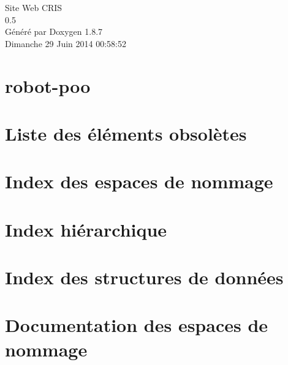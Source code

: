 \documentclass[twoside]{book}
\newcommand{\+}{\discretionary{\mbox{\scriptsize$\hookleftarrow$}}{}{}}
\newcommand{\clearemptydoublepage}{%
  \newpage{\pagestyle{empty}\cleardoublepage}%
}
\begin{document}
\hypersetup{pageanchor=false,
             bookmarks=true,
             bookmarksnumbered=true,
             pdfencoding=unicode
            }
\begin{titlepage}
\vspace*{7cm}
\begin{center}%
{\Large Site Web C\+R\+I\+S \\[1ex]\large 0.\+5 }\\
\vspace*{1cm}
{\large Généré par Doxygen 1.8.7}\\
\vspace*{0.5cm}
{\small Dimanche 29 Juin 2014 00:58:52}\\
\end{center}
\end{titlepage}
\clearemptydoublepage
\tableofcontents
\clearemptydoublepage
{}
\hypersetup{pageanchor=true}

\chapter{robot-\/poo}
\label{md__c_1_wamp_www_robot-poo__r_e_a_d_m_e}
\hypertarget{md__c_1_wamp_www_robot-poo__r_e_a_d_m_e}{}

\chapter{Liste des éléments obsolètes}
\label{deprecated}
\hypertarget{deprecated}{}

\chapter{Index des espaces de nommage}

\chapter{Index hiérarchique}

\chapter{Index des structures de données}

\chapter{Documentation des espaces de nommage}

\end{document}
